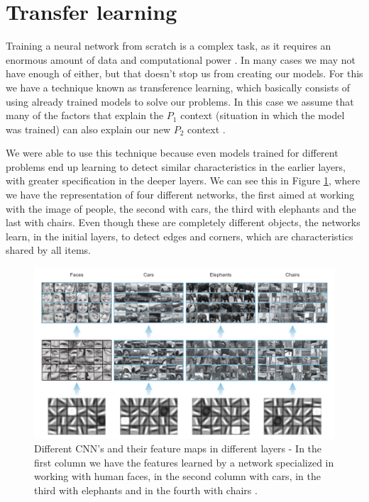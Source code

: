 \section{Transfer learning} \label{transferlearning}
Training a neural network from scratch is a complex task, as it requires an enormous amount of data and computational power \cite{elgendy2020}. In many cases we may not have enough of either, but that doesn't stop us from creating our models. For this we have a technique known as transference learning, which basically consists of using already trained models to solve our problems. In this case we assume that many of the factors that explain the $P_1$ context (situation in which the model was trained) can also explain our new $P_2$ context \cite{goodfellow2016}.

We were able to use this technique because even models trained for different problems end up learning to detect similar characteristics in the earlier layers, with greater specification in the deeper layers. We can see this in Figure \ref{fig:figure139}, where we have the representation of four different networks, the first aimed at working with the image of people, the second with cars, the third with elephants and the last with chairs. Even though these are completely different objects, the networks learn, in the initial layers, to detect edges and corners, which are characteristics shared by all items.

\begin{figure}
    \centering
    \includegraphics[scale=0.4]{"Part 3 - Learning Systems/Supervised Learning/Deep Learning/images/figure139.png"}
    \caption{Different CNN's and their feature maps in different layers - In the first column we have the features learned by a network specialized in working with human faces, in the second column with cars, in the third with elephants and in the fourth with chairs \cite{elgendy2020}.}
    \label{fig:figure139}
\end{figure}

